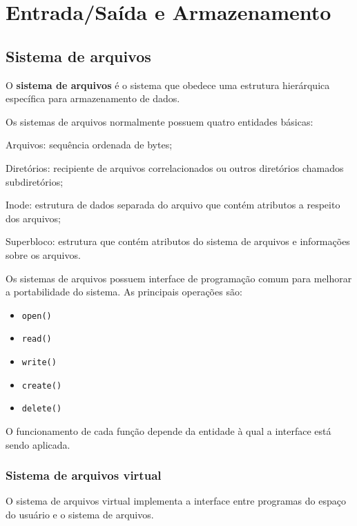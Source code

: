 

\chapter{Entrada/Saída e Armazenamento}


\def\thetitle{Sistema de arquivos}

\section{\thetitle}

O {\bf sistema de arquivos} é o sistema que obedece uma estrutura
hierárquica específica para armazenamento de dados.

Os sistemas de arquivos normalmente possuem quatro entidades básicas:

\begin{description}
\item{Arquivos: }sequência ordenada de bytes;
\item{Diretórios: }recipiente de arquivos correlacionados ou outros
  diretórios chamados subdiretórios;
\item{Inode: }estrutura de dados separada do arquivo que contém
  atributos a respeito dos arquivos;
\item{Superbloco: }estrutura que contém atributos do sistema de
  arquivos e informações sobre os arquivos.
\end{description}

Os sistemas de arquivos possuem interface de programação comum para
melhorar a portabilidade do sistema. As principais operações são:

\begin{itemize}
\item {\tt open()}\item {\tt read()}\item {\tt write()}
\item {\tt create()}\item {\tt delete()}
\end{itemize}

O funcionamento de cada função depende da entidade à qual a interface
está sendo aplicada.

\subsection{Sistema de arquivos virtual}

O sistema de arquivos virtual implementa a interface entre programas
do espaço do usuário e o sistema de arquivos.

